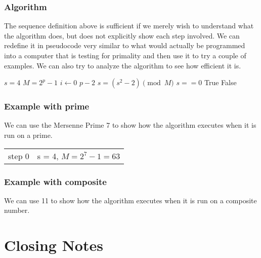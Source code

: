 \subsubsection{Algorithm}

The sequence definition above is sufficient if we merely wish to understand what the algorithm does, but does not explicitly show each step involved.  We can redefine it in pseudocode very similar to what would actually be programmed into a computer that is testing for primality and then use it to try a couple of examples. We can also try to analyze the algorithm to see how efficient it is.

\begin{codebox}
\li$s = 4$
\li$M = 2^p - 1$
\li \For $i \gets 0$ \To $p - 2$
\Do\li
$s = (s^2 - 2) \pmod{M}$
\End\li
\If $s == 0$
\Then
\li\Return True \li
\Else
\li\Return False
\End
\end{codebox}

\subsubsection{Example with prime}

We can use the Mersenne Prime 7 to show how the algorithm executes when it is run on a prime.
\begin{tabular}{ll}
step 0&s = 4, $M = 2^7 -1 = 63$
\end{tabular}

\subsubsection{Example with composite} 

We can use 11 to show how the algorithm executes when it is run on a composite number.


\section{Closing Notes}

